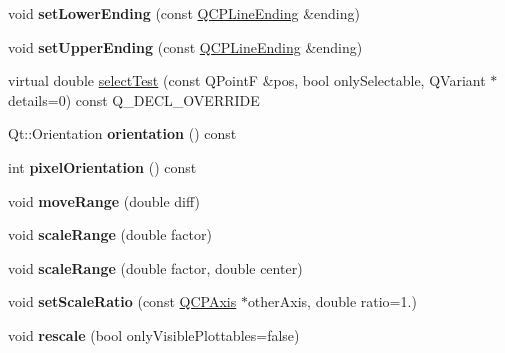 \begin{DoxyCompactItemize}
\item 
void {\bfseries set\+Lower\+Ending} (const \hyperlink{class_q_c_p_line_ending}{Q\+C\+P\+Line\+Ending} \&ending)\hypertarget{class_q_c_p_axis_a08af1c72db9ae4dc8cb8a973d44405ab}{}\label{class_q_c_p_axis_a08af1c72db9ae4dc8cb8a973d44405ab}

\item 
void {\bfseries set\+Upper\+Ending} (const \hyperlink{class_q_c_p_line_ending}{Q\+C\+P\+Line\+Ending} \&ending)\hypertarget{class_q_c_p_axis_a69119b892fc306f651763596685aa377}{}\label{class_q_c_p_axis_a69119b892fc306f651763596685aa377}

\item 
virtual double \hyperlink{class_q_c_p_axis_ad5db8e8f406fa52621d6cb7b35b9d63c}{select\+Test} (const Q\+PointF \&pos, bool only\+Selectable, Q\+Variant $\ast$details=0) const Q\+\_\+\+D\+E\+C\+L\+\_\+\+O\+V\+E\+R\+R\+I\+DE
\item 
Qt\+::\+Orientation {\bfseries orientation} () const \hypertarget{class_q_c_p_axis_a57483f2f60145ddc9e63f3af53959265}{}\label{class_q_c_p_axis_a57483f2f60145ddc9e63f3af53959265}

\item 
int {\bfseries pixel\+Orientation} () const \hypertarget{class_q_c_p_axis_ae3b000e10a6885b8ee05298ae7124ab6}{}\label{class_q_c_p_axis_ae3b000e10a6885b8ee05298ae7124ab6}

\item 
void {\bfseries move\+Range} (double diff)\hypertarget{class_q_c_p_axis_a18f3a68f2b691af1fd34b6593c886630}{}\label{class_q_c_p_axis_a18f3a68f2b691af1fd34b6593c886630}

\item 
void {\bfseries scale\+Range} (double factor)\hypertarget{class_q_c_p_axis_a31d18ddf3a4f21ceb077db8ae5b69856}{}\label{class_q_c_p_axis_a31d18ddf3a4f21ceb077db8ae5b69856}

\item 
void {\bfseries scale\+Range} (double factor, double center)\hypertarget{class_q_c_p_axis_a7072ff96fe690148f1bbcdb4f773ea1c}{}\label{class_q_c_p_axis_a7072ff96fe690148f1bbcdb4f773ea1c}

\item 
void {\bfseries set\+Scale\+Ratio} (const \hyperlink{class_q_c_p_axis}{Q\+C\+P\+Axis} $\ast$other\+Axis, double ratio=1.)\hypertarget{class_q_c_p_axis_af4bbd446dcaee5a83ac30ce9bcd6e125}{}\label{class_q_c_p_axis_af4bbd446dcaee5a83ac30ce9bcd6e125}

\item 
void {\bfseries rescale} (bool only\+Visible\+Plottables=false)\hypertarget{class_q_c_p_axis_a499345f02ebce4b23d8ccec96e58daa9}{}\label{class_q_c_p_axis_a499345f02ebce4b23d8ccec96e58daa9}


\end{DoxyCompactItemize}
